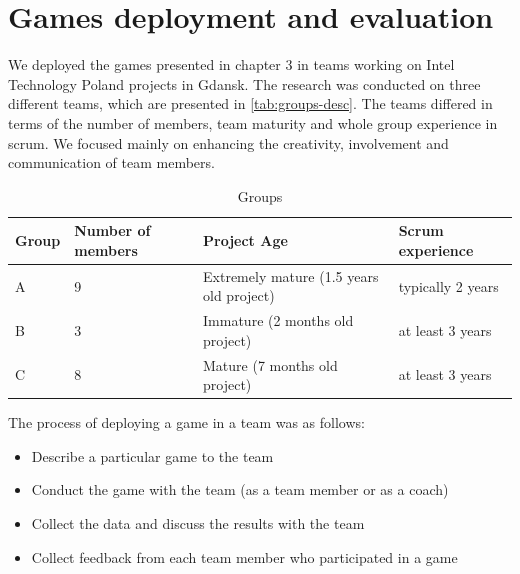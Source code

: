 \chapter{Games deployment and evaluation}
\label{ch:gamesDepl}
We deployed the games presented in chapter 3 in teams working on Intel Technology Poland projects in Gdansk. The research was conducted on three different teams, which are presented in \autoref{tab:groups-desc}. The teams differed in terms of the number of members, team maturity and whole group experience in scrum. We focused mainly on enhancing the creativity, involvement and communication of team members.


\begin{table}[!htbp]
	\caption{Groups}
	\label{tab:groups-desc}
	\begin{tabularx}{\textwidth}{|X|X|X|X|}
	\hline
		Group & Number of members & Project Age & Scrum experience \\ \hline
		A & 9 & Extremely mature (1.5 years old project) & typically 2 years  \\ \hline
		B & 3 & Immature (2 months old project) & at least 3 years  \\ \hline
		C & 8 & Mature (7 months old project) & at least 3 years \\ \hline
	\end{tabularx}
\end{table}

The process of deploying a game in a team was as follows:
\begin{itemize}
    \item Describe a particular game to the team
    \item Conduct the game with the team (as a team member or as a coach)
    \item Collect the data and discuss the results with the team
    \item Collect feedback from each team member who participated in a game
\end{itemize}

